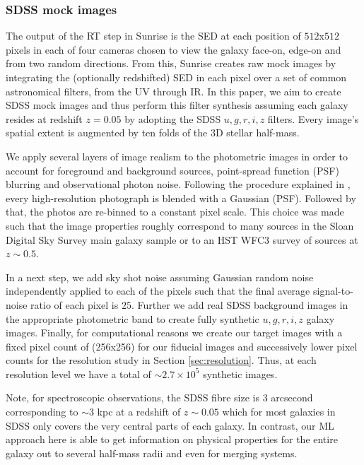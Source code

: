 \documentclass[conference]{IEEEtran}
\begin{document}
\subsubsection{SDSS mock images}
The output of the RT step in {\sc Sunrise} is the SED at each position of $512$x$512$ pixels in each of four cameras chosen to view the galaxy face-on, edge-on and from two random directions. From this, Sunrise creates raw mock images by integrating the (optionally redshifted) SED in each pixel over a set of common astronomical filters, from the UV through IR. In this paper, we aim to create SDSS mock images and thus perform this filter synthesis assuming each galaxy resides at redshift $z=0.05$ by adopting the SDSS $u,g,r,i,z$ filters. Every image's spatial extent is augmented by ten folds of the 3D stellar half-mass.

We apply several layers of image realism to the photometric images in order to account for foreground and background sources, point-spread function (PSF) blurring and observational photon noise. Following the procedure explained in \cite{Snyder2015}, every high-resolution photograph is blended with a Gaussian (PSF). Followed by that, the photos are re-binned to a constant pixel scale. This choice was made such that the image properties roughly correspond to many sources in the Sloan Digital Sky Survey main galaxy sample \citep{Strauss2002} or to an HST WFC3 survey of sources at $z \sim 0.5$.

In a next step, we add sky shot noise assuming Gaussian random noise independently applied to each of the pixels such that the final average signal-to-noise ratio of each pixel is $25$. Further we add real SDSS background images in the appropriate photometric band to create fully synthetic $u,g,r,i,z$ galaxy images. Finally, for computational reasons we create our target images with a fixed pixel count of (256x256) for our fiducial images and successively lower pixel counts for the resolution study in Section \ref{sec:resolution}. Thus, at each resolution level we have a total of $\sim2.7 \times 10^5$ synthetic images. 

Note, for spectroscopic observations, the SDSS fibre size is $3$ arcsecond corresponding to $\sim3$ kpc at a redshift of $z\sim0.05$ which for most galaxies in SDSS only covers the very central parts of each galaxy. In contrast, our ML approach here is able to get information on physical properties for the entire galaxy out to several half-mass radii and even for merging systems.
\end{document}
